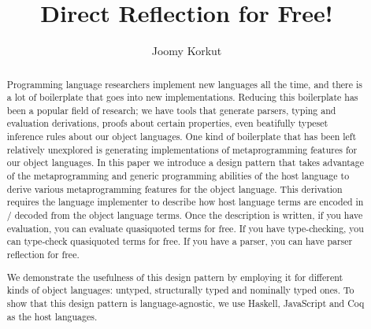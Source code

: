 \documentclass[acmsmall, review=false, screen]{acmart}
\newcommand{\lam}{\texorpdfstring{\textlambda}{lambda}}
\newcommand{\Lam}{\texorpdfstring{\textlambda}{Lambda}}
\begin{document}
\title{Direct Reflection for Free!}
\subtitle{}

\author{Joomy Korkut}


\renewcommand{\shortauthors}{Joomy Korkut}

\newcommand{\lc}{\mbox{\lam-calculus}}
\newcommand{\Lc}{\mbox{\Lam-calculus}}

\begin{abstract}
Programming language researchers implement new languages all the time, and there is a lot of boilerplate that goes into new implementations. Reducing this boilerplate has been a popular field of research; we have tools that generate parsers, typing and evaluation derivations, proofs about certain properties, even beatifully typeset inference rules about our object languages. One kind of boilerplate that has been left relatively unexplored is generating implementations of metaprogramming features for our object languages. In this paper we introduce a design pattern that takes advantage of the metaprogramming and generic programming abilities of the host language to derive various metaprogramming features for the object language. This derivation requires the language implementer to describe how host language terms are encoded in / decoded from the object language terms. Once the description is written, if you have evaluation, you can evaluate quasiquoted terms for free. If you have type-checking, you can type-check quasiquoted terms for free. If you have a parser, you can have parser reflection for free.

We demonstrate the usefulness of this design pattern by employing it for different kinds of object languages: untyped, structurally typed and nominally typed ones. To show that this design pattern is language-agnostic, we use Haskell, JavaScript and Coq as the host languages. 
  
\end{abstract}
\end{document}
